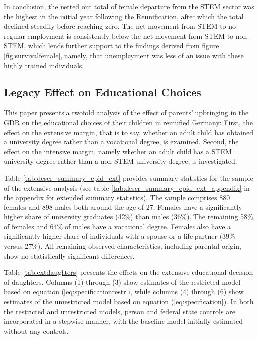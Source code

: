 \documentclass[a4paper, oneside, hyperfootnotes = false]{article}
\begin{document}
{In conclusion, the netted out total of female departure from the STEM sector was the highest in the initial year following the Reunification, after which the total declined steadily before reaching zero.
The net movement from STEM to no regular employment is consistently below the net movement from STEM to non-STEM, which lends further support to the findings derived from figure \ref{fig:survivalfemale}, namely, that unemployment was less of an issue with these highly trained individuals.

\subsection{Legacy Effect on Educational Choices}
\label{educational}

This paper presents a twofold analysis of the effect of parents' upbringing in the GDR on the educational choices of their children in reunified Germany:
First, the effect on the extensive margin, that is to say, whether an adult child has obtained a university degree rather than a vocational degree, is examined.
Second, the effect on the intensive margin, namely whether an adult child has a STEM university degree rather than a non-STEM university degree, is investigated.

Table \ref{tab:descr_summary_epid_ext} provides summary statistics for the sample of the extensive analysis (see table \ref{tab:descr_summary_epid_ext_appendix} in the appendix for extended summary statistics).
The sample comprises 880 females and 898 males both around the age of 27.
Females have a significantly higher share of university graduates (42\%) than males (36\%).
The remaining 58\% of females and 64\% of males have a vocational degree.
Females also have a significantly higher share of individuals with a spouse or a life partner (39\% versus 27\%).
All remaining observed characteristics, including parental origin, show no statistically significant differences.

Table \ref{tab:extdaughters} presents the effects on the extensive educational decision of daughters.
Columns (1) through (3) show estimates of the restricted model based on equation (\ref{eq:specificationrestr}), while columns (4) through (6) show estimates of the unrestricted model based on equation (\ref{eq:specification}).
In both the restricted and unrestricted models, person and federal state controls are incorporated in a stepwise manner, with the baseline model initially estimated without any controls.

}
\end{document}

